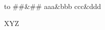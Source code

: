 \documentclass{article}
\newenvironment{MetricalScheme}{%
  \let\par=\cr \obeylines %
  \halign to \hsize \bgroup ##\hfill&##\hfill}{\egroup}
\begin{document}
\begin{MetricalScheme}
aaa&bbb
ccc&ddd
\end{MetricalScheme}
\par XYZ
\end{document}

